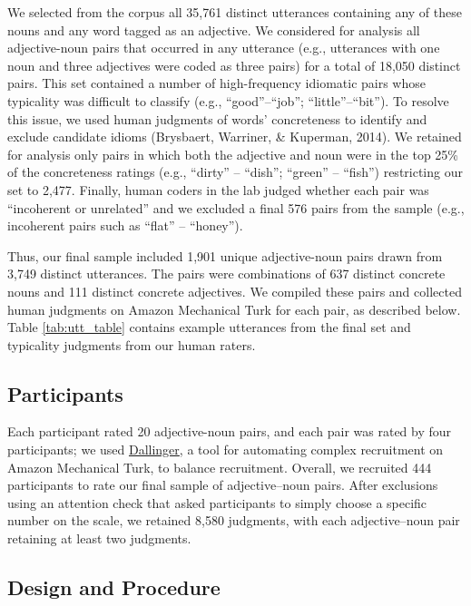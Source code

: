 \documentclass[10pt, letterpaper]{article}
\begin{document}
We selected from the corpus all 35,761 distinct utterances containing
any of these nouns and any word tagged as an adjective. We considered
for analysis all adjective-noun pairs that occurred in any utterance
(e.g., utterances with one noun and three adjectives were coded as three
pairs) for a total of 18,050 distinct pairs. This set contained a number
of high-frequency idiomatic pairs whose typicality was difficult to
classify (e.g., ``good''--``job''; ``little''--``bit''). To resolve this
issue, we used human judgments of words' concreteness to identify and
exclude candidate idioms (Brysbaert, Warriner, \& Kuperman, 2014). We
retained for analysis only pairs in which both the adjective and noun
were in the top 25\% of the concreteness ratings (e.g., ``dirty'' --
``dish''; ``green'' -- ``fish'') restricting our set to 2,477. Finally,
human coders in the lab judged whether each pair was ``incoherent or
unrelated'' and we excluded a final 576 pairs from the sample (e.g.,
incoherent pairs such as ``flat'' -- ``honey'').

Thus, our final sample included 1,901 unique adjective-noun pairs drawn
from 3,749 distinct utterances. The pairs were combinations of 637
distinct concrete nouns and 111 distinct concrete adjectives. We
compiled these pairs and collected human judgments on Amazon Mechanical
Turk for each pair, as described below. Table \ref{tab:utt_table}
contains example utterances from the final set and typicality judgments
from our human raters.

\hypertarget{participants}{%
\subsection{Participants}\label{participants}}

Each participant rated 20 adjective-noun pairs, and each pair was rated
by four participants; we used
\href{http://docs.dallinger.io/en/latest/}{Dallinger}, a tool for
automating complex recruitment on Amazon Mechanical Turk, to balance
recruitment. Overall, we recruited 444 participants to rate our final
sample of adjective--noun pairs. After exclusions using an attention
check that asked participants to simply choose a specific number on the
scale, we retained 8,580 judgments, with each adjective--noun pair
retaining at least two judgments.

\hypertarget{design-and-procedure}{%
\subsection{Design and Procedure}\label{design-and-procedure}}
\end{document}
